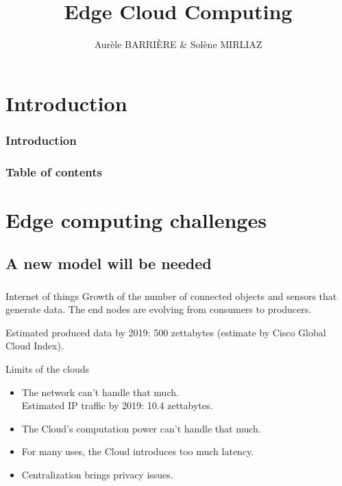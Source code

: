 \documentclass[utf8,xcolor=table, page number]{earlywinter}
\begin{document}
\title{Edge Cloud Computing}
\author{Aurèle BARRIÈRE & Solène MIRLIAZ}

\begin{frame}[plain]
  \titlepage%
\end{frame}

\section{Introduction}
\begin{frame}
	\frametitle{Introduction}

\end{frame}

  \begin{frame}
    \frametitle{Table of contents}
    \tableofcontents[]
  \end{frame}
  
  
\section{Edge computing challenges}
\subsection{A new model will be needed}
\begin{frame}
  \frametitle{\subsecname}
  \begin{block}{Internet of things}
    Growth of the number of connected objects and sensors that generate data.
    The end nodes are evolving from consumers to producers.
    
    Estimated produced data by 2019: 500 zettabytes (estimate by Cisco Global Cloud Index).
  \end{block}
	\begin{alertblock}{Limits of the clouds}
          \begin{itemize}
          \item The network can't handle that much.\\
              Estimated IP traffic by 2019: 10.4 zettabytes.
            \item The Cloud's computation power can't handle that much.
	    \item For many uses, the Cloud introduces too much latency.
            \item Centralization brings privacy issues.
          \end{itemize}
	\end{alertblock}

\end{frame}
\end{document}
